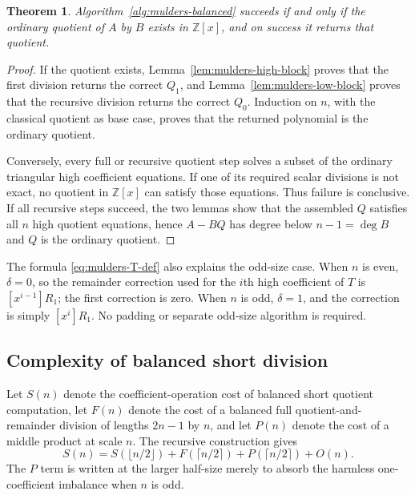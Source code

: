\documentclass[11pt]{book}
\newtheorem{theorem}{Theorem}[section]
\theoremstyle{definition}
\newcommand{\ZZ}{\mathbb Z}
\begin{document}
\begin{theorem}\label{thm:mulders-balanced-correctness}
Algorithm~\ref{alg:mulders-balanced} succeeds if and only if the ordinary
quotient of $A$ by $B$ exists in $\ZZ[x]$, and on success it returns that
quotient.
\end{theorem}

\begin{proof}
If the quotient exists, Lemma~\ref{lem:mulders-high-block} proves that the
first division returns the correct $Q_1$, and
Lemma~\ref{lem:mulders-low-block} proves that the recursive division returns
the correct $Q_0$.  Induction on $n$, with the classical quotient as base
case, proves that the returned polynomial is the ordinary quotient.

Conversely, every full or recursive quotient step solves a subset of the
ordinary triangular high coefficient equations.  If one of its required
scalar divisions is not exact, no quotient in $\ZZ[x]$ can satisfy those
equations.  Thus failure is conclusive.  If all recursive steps succeed, the
two lemmas show that the assembled $Q$ satisfies all $n$ high quotient
equations, hence $A-BQ$ has degree below $n-1=\deg B$ and $Q$ is the ordinary
quotient.
\end{proof}

The formula \eqref{eq:mulders-T-def} also explains the odd-size case.  When
$n$ is even, $\delta=0$, so the remainder correction used for the $i$th high
coefficient of $T$ is $[x^{i-1}]R_1$; the first correction is zero.  When $n$
is odd, $\delta=1$, and the correction is simply $[x^i]R_1$.  No padding or
separate odd-size algorithm is required.

\subsection{Complexity of balanced short division}

Let $S(n)$ denote the coefficient-operation cost of balanced short quotient
computation, let $F(n)$ denote the cost of a balanced full
quotient-and-remainder division of lengths $2n-1$ by $n$, and let $P(n)$
denote the cost of a middle product at scale $n$.  The recursive construction
gives
\begin{equation}\label{eq:mulders-recurrence}
 S(n)
 =S(\lfloor n/2\rfloor)
  +F(\lceil n/2\rceil)
  +P(\lceil n/2\rceil)
  +O(n).
\end{equation}
The $P$ term is written at the larger half-size merely to absorb the harmless
one-coefficient imbalance when $n$ is odd.
\end{document}
